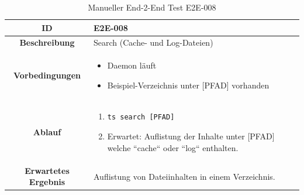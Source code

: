 \documentclass[a4paper,12pt]{report}
\begin{document}
    \begin{table}[h!]
        \centering
        \setlength{\leftmargini}{0.8cm}
        \begin{tabular}{|c|p{10cm}|}
            \hline
            \textbf{ID}                  & E2E-008                                            \\ \hline
            \textbf{Beschreibung}        & Search (Cache- und Log-Dateien)                    \\ \hline
            \textbf{Vorbedingungen} &
            \begin{itemize}
                \item Daemon läuft
                \item Beispiel-Verzeichnis unter [PFAD] vorhanden
            \end{itemize} \\ \hline
            \textbf{Ablauf} &
            \begin{enumerate}
                \item \begin{verbatim}ts search [PFAD]
                \end{verbatim}
                \item Erwartet: Auflistung der Inhalte unter [PFAD] welche ``cache`` oder ``log`` enthalten.
            \end{enumerate} \\ \hline
            \textbf{Erwartetes Ergebnis} & Auflistung von Dateiinhalten in einem Verzeichnis. \\ \hline
        \end{tabular}
        \caption{Manueller End-2-End Test E2E-008}\label{tab:e2e-8}
    \end{table}
    \clearpage
\end{document}

